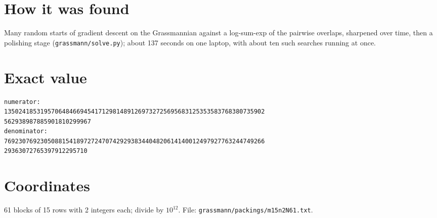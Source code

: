 \documentclass[11pt,a4paper]{article}
\begin{document}
\section{How it was found}
Many random starts of gradient descent on the Grassmannian against a log-sum-exp of the pairwise overlaps, sharpened over time, then a polishing stage (\texttt{grassmann/solve.py}); about 137 seconds on one laptop, with about ten such searches running at once.


\appendix
\section{Exact value}
{\small
\begin{verbatim}
numerator:
135024185319570648466945417129814891269732725695683125353583768380735902
562938987885901810299967
denominator:
769230769230508815418972724707429293834404820614140012497927763244749266
29363072765397912295710
\end{verbatim}}

\section{Coordinates}
61 blocks of 15 rows with 2 integers each; divide by $10^{12}$. File: \texttt{grassmann/packings/m15n2N61.txt}.
{\tiny
\begin{multicols}{4}
\end{multicols}}
\end{document}
